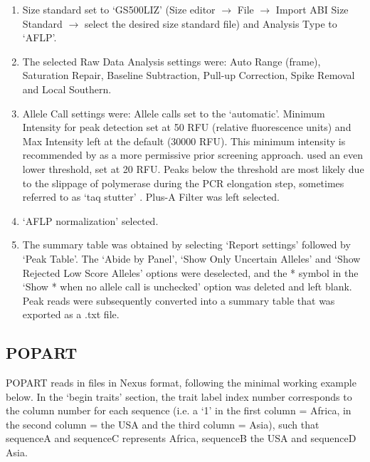 \begin{enumerate}
    \item Size standard set to `GS500LIZ' (Size editor $\rightarrow$ File $\rightarrow$ Import ABI Size Standard $\rightarrow$ select the desired size standard file) and Analysis Type to `AFLP'.
    \item The selected Raw Data Analysis settings were: Auto Range (frame), Saturation Repair, Baseline Subtraction, Pull-up Correction, Spike Removal and Local Southern.
    \item Allele Call settings were: Allele calls set to the `automatic'. Minimum Intensity for peak detection set at 50 RFU (relative fluorescence units) and Max Intensity left at the default (30000 RFU). This minimum intensity is recommended by \citet{arrigo2012automated} as a more permissive prior screening approach. \citet{prince2009} used an even lower threshold, set at 20 RFU. Peaks below the threshold are most likely due to the slippage of polymerase during the PCR elongation step, sometimes referred to as `taq stutter' \citep{DNAFragAnalysis, prince2009}. Plus-A Filter was left selected.
    \item `AFLP normalization' selected.
    \item The summary table was obtained by selecting `Report settings' followed by `Peak Table'. The `Abide by Panel', `Show Only Uncertain Alleles' and `Show Rejected Low Score Alleles' options were deselected, and the * symbol in the `Show * when no allele call is unchecked' option was deleted and left blank. Peak reads were subsequently converted into a summary table that was exported as a .txt file.
\end{enumerate}

\subsection{POPART}
\label{appendix:popart}
POPART reads in files in Nexus format, following the minimal working example below. In the `begin traits' section, the trait label index number corresponds to the column number for each sequence (i.e. a `1' in the first column = Africa, in the second column = the USA and the third column = Asia), such that sequenceA and sequenceC represents Africa, sequenceB the USA and sequenceD Asia. \\

